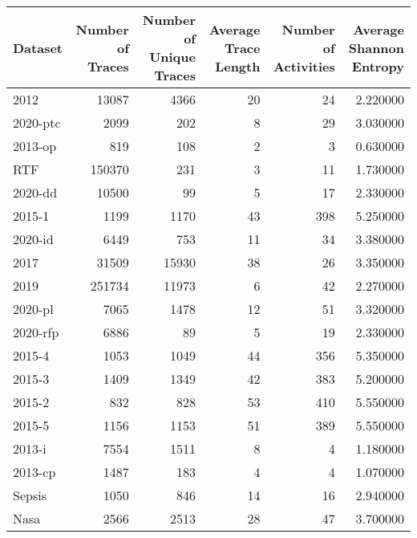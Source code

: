 \begin{tabular}{lrrrrr}
\toprule
Dataset & Number of Traces & Number of Unique Traces & Average Trace Length & Number of Activities & Average Shannon Entropy \\
\midrule
2012 & 13087 & 4366 & 20 & 24 & 2.220000 \\
2020-ptc & 2099 & 202 & 8 & 29 & 3.030000 \\
2013-op & 819 & 108 & 2 & 3 & 0.630000 \\
RTF & 150370 & 231 & 3 & 11 & 1.730000 \\
2020-dd & 10500 & 99 & 5 & 17 & 2.330000 \\
2015-1 & 1199 & 1170 & 43 & 398 & 5.250000 \\
2020-id & 6449 & 753 & 11 & 34 & 3.380000 \\
2017 & 31509 & 15930 & 38 & 26 & 3.350000 \\
2019 & 251734 & 11973 & 6 & 42 & 2.270000 \\
2020-pl & 7065 & 1478 & 12 & 51 & 3.320000 \\
2020-rfp & 6886 & 89 & 5 & 19 & 2.330000 \\
2015-4 & 1053 & 1049 & 44 & 356 & 5.350000 \\
2015-3 & 1409 & 1349 & 42 & 383 & 5.200000 \\
2015-2 & 832 & 828 & 53 & 410 & 5.550000 \\
2015-5 & 1156 & 1153 & 51 & 389 & 5.550000 \\
2013-i & 7554 & 1511 & 8 & 4 & 1.180000 \\
2013-cp & 1487 & 183 & 4 & 4 & 1.070000 \\
Sepsis & 1050 & 846 & 14 & 16 & 2.940000 \\
Nasa & 2566 & 2513 & 28 & 47 & 3.700000 \\
\bottomrule
\end{tabular}
